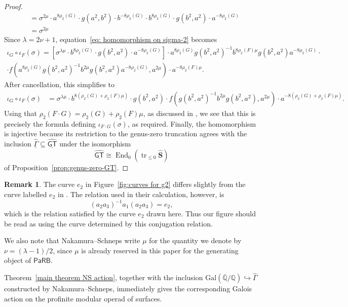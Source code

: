 \documentclass{amsart}
\newcommand{\PaRB}{\mathsf{PaRB}}
\newcommand{\galQ}{\mathbf{\mathrm{Gal}}(\overline{\mathbb{Q}}/\mathbb{Q})}
\newcommand{\End}{\operatorname{End}}
\newcommand{\GT}{\widehat{\mathsf{GT}}}
\newcommand{\NS}{\widehat{\mathsf{\Gamma}}}
\theoremstyle{definition}
\newtheorem{remark}[theorem]{Remark}%
\numberwithin{equation}{section}
\begin{document}
\begin{proof}
\begin{align*}
        &=\sigma^{2\mu}\cdot a^{8\rho_2(G)}\cdot g(a^2,b^2) \cdot b^{-8\rho_2(G)}\cdot b^{8\rho_2(G)}\cdot g(b^2,a^2) \cdot a^{-8\rho_2(G)}\\
        &=\sigma^{2\mu}
    \end{align*}
Since $\lambda=2\nu+1$, equation~\eqref{eq: homomorphism on sigma-2} becomes
    \begin{multline*}
        \iota_G\circ \iota_F(\sigma)=[\sigma^{\lambda\mu}\cdot b^{8\rho_2(G)}\cdot g(b^2,a^2) \cdot a^{-8\rho_2(G)}] \cdot a^{8\rho_2(G)}  g(b^2,a^2)^{-1}  b^{8\rho_2(F)\mu} g(b^2,a^2)  a^{-8\rho_2(G)}\cdot\\
         \cdot f(a^{8\rho_2(G)}  g(b^2,a^2)^{-1}  b^{2\mu} g(b^2,a^2)  a^{-8\rho_2(G)},a^{2\mu})\cdot a^{-8\rho_2(F)\mu}.
    \end{multline*}
After cancellation, this simplifies to
    \begin{align*}
        \iota_G\circ \iota_F(\sigma)&=\sigma^{\lambda\mu}\cdot b^{8(\rho_2(G)+\rho_2(F)\mu)} \cdot g(b^2,a^2)\cdot f(g(b^2,a^2)^{-1}  b^{2\mu} g(b^2,a^2),a^{2\mu})\cdot a^{-8(\rho_2(G)+\rho_2(F)\mu)}.
    \end{align*}
Using that $\rho_2(F\cdot G)=\rho_2(G)+\rho_2(F)\mu$, as discussed in \cite[Corollary 5.2]{Nakamura-Schneps}, we see that this is precisely the formula defining $\iota_{F\cdot G}(\sigma)$, as required.  Finally, the homomorphism is injective because its restriction to the
genus-zero truncation agrees with the inclusion
\(\underline{\NS}\subseteq \underline{\GT}\) under the isomorphism
\[
\underline{\GT}\cong
\End_0(\operatorname{tr}_{\leq 0}\widehat{\mathbf S})
\]
of Proposition~\ref{prop:genus-zero-GT}.
\end{proof}

\begin{remark}
The curve $e_2$ in Figure~\ref{fig:curves for g2} differs slightly from the curve labelled $e_2$ in \cite{Nakamura-Schneps}. The relation used in their calculation, however, is
\[
(a_2a_3)^{-1}a_1(a_2a_3)=e_2,
\]
which is the relation satisfied by the curve $e_2$ drawn here. Thus our figure should be read as using the curve determined by this conjugation relation.

We also note that Nakamura--Schneps write $\mu$ for the quantity we denote by $\nu=(\lambda-1)/2$, since $\mu$ is already reserved in this paper for the generating object of $\PaRB$.
\end{remark}

Theorem~\ref{main theorem NS action}, together with the inclusion $\galQ\hookrightarrow \NS$ constructed by Nakamura--Schneps, immediately gives the corresponding Galois action on the profinite modular operad of
surfaces.
\end{document}
